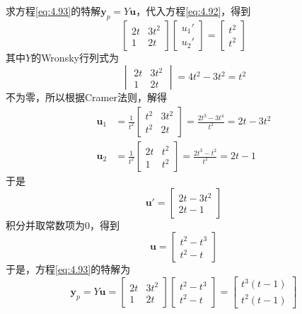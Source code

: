 \begin{solution}
    求方程\ref{eq:4.93}的特解$\mathbf{y}_p=Y\mathbf{u}$，代入方程\ref{eq:4.92}，得到
    \[
        \begin{bmatrix}
            2t & 3t^2 \\
            1  & 2t
        \end{bmatrix}\begin{bmatrix}
            u_1' \\
            u_2'
        \end{bmatrix}=\begin{bmatrix}
            t^2 \\
            t^2
        \end{bmatrix}
    \]
    其中$Y$的Wronsky行列式为
    \[
        \begin{vmatrix}
            2t & 3t^2 \\
            1  & 2t
        \end{vmatrix}=4t^2-3t^2=t^2
    \]
    不为零，所以根据Cramer法则，解得
    \begin{align*}
        \mathbf{u}_1 & =\frac{1}{t^2}\begin{bmatrix}
                                         t^2 & 3t^2 \\
                                         t^2 & 2t
                                     \end{bmatrix}=\frac{2t^3-3t^4}{t^2}=2t-3t^2 \\
        \mathbf{u}_2 & =\frac{1}{t^2}\begin{bmatrix}
                                         2t & t^2 \\
                                         1  & t^2
                                     \end{bmatrix}=\frac{2t^3-t^2}{t^2}=2t-1
    \end{align*}
    于是
    \[
        \mathbf{u}'=\begin{bmatrix}
            2t-3t^2 \\
            2t-1
        \end{bmatrix}
    \]
    积分并取常数项为$0$，得到
    \[
        \mathbf{u}=\begin{bmatrix}
            t^2-t^3 \\
            t^2-t
        \end{bmatrix}
    \]
    于是，方程\ref{eq:4.93}的特解为
    \[
        \mathbf{y}_p=Y\mathbf{u}=\begin{bmatrix}
            2t & 3t^2 \\
            1  & 2t
        \end{bmatrix}\begin{bmatrix}
            t^2-t^3 \\
            t^2-t
        \end{bmatrix}
        =\begin{bmatrix}
            t^3(t-1) \\
            t^2(t-1)
        \end{bmatrix}
    \]
\end{solution}



